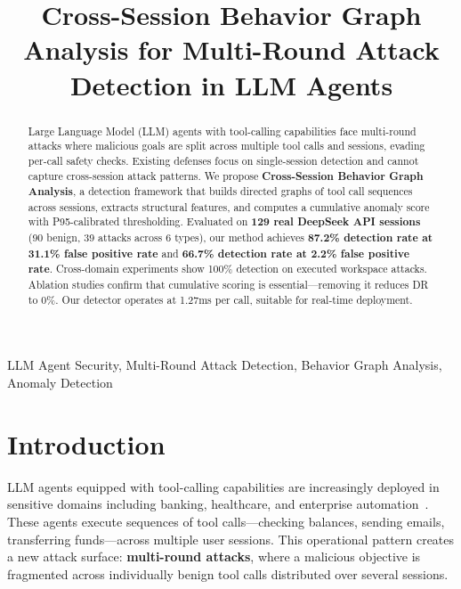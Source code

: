 \documentclass[conference]{IEEEtran}
\begin{document}
\title{Cross-Session Behavior Graph Analysis for Multi-Round Attack Detection in LLM Agents}

\author{
}

\maketitle

\begin{abstract}
Large Language Model (LLM) agents with tool-calling capabilities face multi-round attacks where malicious goals are split across multiple tool calls and sessions, evading per-call safety checks. Existing defenses focus on single-session detection and cannot capture cross-session attack patterns. We propose \textbf{Cross-Session Behavior Graph Analysis}, a detection framework that builds directed graphs of tool call sequences across sessions, extracts structural features, and computes a cumulative anomaly score with P95-calibrated thresholding. Evaluated on \textbf{129 real DeepSeek API sessions} (90 benign, 39 attacks across 6 types), our method achieves \textbf{87.2\% detection rate at 31.1\% false positive rate} and \textbf{66.7\% detection rate at 2.2\% false positive rate}. Cross-domain experiments show 100\% detection on executed workspace attacks. Ablation studies confirm that cumulative scoring is essential---removing it reduces DR to 0\%. Our detector operates at 1.27ms per call, suitable for real-time deployment.
\end{abstract}

\begin{IEEEkeywords}
LLM Agent Security, Multi-Round Attack Detection, Behavior Graph Analysis, Anomaly Detection
\end{IEEEkeywords}

\section{Introduction}
\label{sec:intro}

LLM agents equipped with tool-calling capabilities are increasingly deployed in sensitive domains including banking, healthcare, and enterprise automation~\cite{agentshield, leong}. These agents execute sequences of tool calls---checking balances, sending emails, transferring funds---across multiple user sessions. This operational pattern creates a new attack surface: \textbf{multi-round attacks}, where a malicious objective is fragmented across individually benign tool calls distributed over several sessions.
\end{document}

